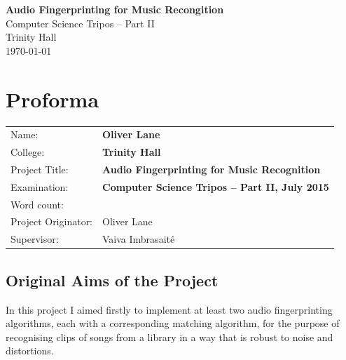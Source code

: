 \documentclass[12pt,a4paper,twoside,openright]{report}
\begin{document}





\pagestyle{empty}


\vspace*{60mm}
\begin{center}
\Huge
\textbf{Audio Fingerprinting for Music Recongition} \\[5mm]
Computer Science Tripos -- Part II \\[5mm]
Trinity Hall \\[5mm]
\today  %
\end{center}


\pagestyle{plain}

\chapter*{Proforma}

{\large
\begin{tabular}{ll}
Name:               & \bf Oliver Lane                       \\
College:            & \bf Trinity Hall                     \\
Project Title:      & \bf Audio Fingerprinting for Music Recognition \\
Examination:        & \bf Computer Science Tripos -- Part II, July 2015  \\
Word count:         & \bf   \\
Project Originator: & Oliver Lane                    \\
Supervisor:         & Vaiva Imbrasait\'{e}                    \\ 
\end{tabular}
}


\section*{Original Aims of the Project}

In this project I aimed firstly to implement at least two audio fingerprinting algorithms, each with a corresponding matching algorithm, for the purpose of recognising clips of songs from a library in a way that is robust to noise and distortions.
\end{document}
